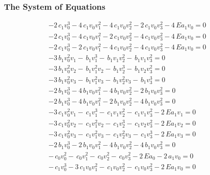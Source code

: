\documentclass{beamer}
\begin{document}
\begin{frame}
\frametitle{The System of Equations}
\fontsize{9}{11}\selectfont
\begin{minipage}{.7\linewidth}
\begin{equation*}
\begin{array}{r}
-2 \, c_{1} v_{0}^{3} - 4 \, c_{1} v_{0} v_{1}^{2} - 4 \, c_{1} v_{0} v_{2}^{2} - 2 \, c_{1} v_{0} v_{3}^{2} - 4 \, E a_{1} v_{0} =0\\
-2 \, c_{1} v_{0}^{3} - 4 \, c_{1} v_{0} v_{1}^{2} - 2 \, c_{1} v_{0} v_{2}^{2} - 4 \, c_{1} v_{0} v_{3}^{2} - 4 \, E a_{1} v_{0} =0\\
-2 \, c_{1} v_{0}^{3} - 2 \, c_{1} v_{0} v_{1}^{2} - 4 \, c_{1} v_{0} v_{2}^{2} - 4 \, c_{1} v_{0} v_{3}^{2} - 4 \, E a_{1} v_{0} =0\\
-3 \, b_{1} v_{0}^{2} v_{1} -  \, b_{1} v_{1}^{3} -  \, b_{1} v_{1} v_{2}^{2} -  \, b_{1} v_{1} v_{3}^{2} =0\\
-3 \, b_{1} v_{0}^{2} v_{2} -  \, b_{1} v_{1}^{2} v_{2} -  \, b_{1} v_{2}^{3} -  \, b_{1} v_{2} v_{3}^{2} =0\\
-3 \, b_{1} v_{0}^{2} v_{3} -  \, b_{1} v_{1}^{2} v_{3} -  \, b_{1} v_{2}^{2} v_{3} -  \, b_{1} v_{3}^{3} =0\\
-2 \, b_{1} v_{0}^{3} - 4 \, b_{1} v_{0} v_{1}^{2} - 4 \, b_{1} v_{0} v_{2}^{2} - 2 \, b_{1} v_{0} v_{3}^{2} =0\\
-2 \, b_{1} v_{0}^{3} - 4 \, b_{1} v_{0} v_{1}^{2} - 2 \, b_{1} v_{0} v_{2}^{2} - 4 \, b_{1} v_{0} v_{3}^{2} =0\\
-3 \, c_{1} v_{0}^{2} v_{1} -  \, c_{1} v_{1}^{3} -  \, c_{1} v_{1} v_{2}^{2} -  \, c_{1} v_{1} v_{3}^{2} - 2 \, E a_{1} v_{1} =0\\
-3 \, c_{1} v_{0}^{2} v_{2} -  \, c_{1} v_{1}^{2} v_{2} -  \, c_{1} v_{2}^{3} -  \, c_{1} v_{2} v_{3}^{2} - 2 \, E a_{1} v_{2} =0\\
-3 \, c_{1} v_{0}^{2} v_{3} -  \, c_{1} v_{1}^{2} v_{3} -  \, c_{1} v_{2}^{2} v_{3} -  \, c_{1} v_{3}^{3} - 2 \, E a_{1} v_{3} =0\\
-2 \, b_{1} v_{0}^{3} - 2 \, b_{1} v_{0} v_{1}^{2} - 4 \, b_{1} v_{0} v_{2}^{2} - 4 \, b_{1} v_{0} v_{3}^{2} =0\\
- \, c_{0} v_{0}^{2} -  \, c_{0} v_{1}^{2} -  \, c_{0} v_{2}^{2} -  \, c_{0} v_{3}^{2} - 2 \, E a_{0} - 2 \, a_{1} v_{0} =0\\
- \, c_{1} v_{0}^{3} - 3 \, c_{1} v_{0} v_{1}^{2} -  \, c_{1} v_{0} v_{2}^{2} -  \, c_{1} v_{0} v_{3}^{2} - 2 \, E a_{1} v_{0} =0\\

\end{array}
\end{equation*}
\end{minipage}
\end{frame}
\end{document}
